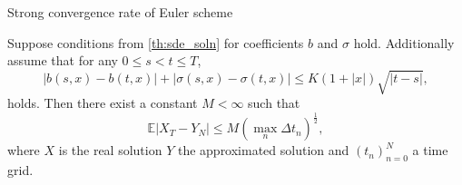 \documentclass{beamer}
\begin{document}
\begin{frame}{Strong convergence rate of Euler scheme}
        \begin{theorem}
                Suppose conditions from
                \cref{th:sde_soln}
                for coefficients
                $ b $
                and
                $ \sigma $ 
                hold.
                Additionally assume that for any
                $ 0 \le s < t \le T $,
                \begin{equation*}
                        \label{eq:ext_lin_g}
                        | b(s, x) - b(t, x) | + | \sigma(s, x) - \sigma(t, x) |
                        \leq
                        K (1 + |x|) \sqrt{| t - s |},
                \end{equation*}
                holds.
                Then there exist a constant
                $ M < \infty $
                such that
                \begin{equation*}
                        \mathbb{E} | X_T - Y_N | \leq M \left( \max_{n} \Delta t_n \right)^{\frac{1}{2}},
                \end{equation*}
                where
                $ X $
                is the real solution
                $ Y $
                the approximated solution and
                $ (t_{n})_{n=0}^{N} $
                a time grid.
        \end{theorem}

\end{frame}
\end{document}
